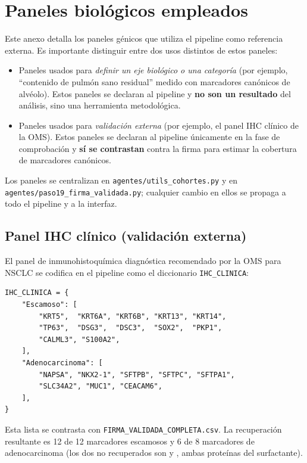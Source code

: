 \chapter{Paneles biológicos empleados}
\label{anexo:paneles}

Este anexo detalla los paneles génicos que utiliza el pipeline como
referencia externa. Es importante distinguir entre dos usos distintos de
estos paneles:

\begin{itemize}
  \item Paneles usados para \emph{definir un eje biológico o una
  categoría} (por ejemplo, ``contenido de pulmón sano residual''
  medido con marcadores canónicos de alvéolo). Estos paneles se declaran
  al pipeline y \textbf{no son un resultado} del análisis, sino una
  herramienta metodológica.
  \item Paneles usados para \emph{validación externa} (por ejemplo, el
  panel IHC clínico de la OMS). Estos paneles se declaran al pipeline
  únicamente en la fase de comprobación y \textbf{sí se contrastan}
  contra la firma para estimar la cobertura de marcadores canónicos.
\end{itemize}

Los paneles se centralizan en \texttt{agentes/utils\_cohortes.py} y en
\texttt{agentes/paso19\_firma\_validada.py}; cualquier cambio en ellos
se propaga a todo el pipeline y a la interfaz.

\section*{Panel IHC clínico (validación externa)}
{}

El panel de inmunohistoquímica diagnóstica recomendado por la OMS para
NSCLC se codifica en el pipeline como el diccionario \texttt{IHC\_CLINICA}:

\begin{lstlisting}[style=python, caption={Panel IHC clínico usado como validación externa.}]
IHC_CLINICA = {
    "Escamoso": [
        "KRT5",  "KRT6A", "KRT6B", "KRT13", "KRT14",
        "TP63",  "DSG3",  "DSC3",  "SOX2",  "PKP1",
        "CALML3", "S100A2",
    ],
    "Adenocarcinoma": [
        "NAPSA", "NKX2-1", "SFTPB", "SFTPC", "SFTPA1",
        "SLC34A2", "MUC1", "CEACAM6",
    ],
}
\end{lstlisting}

Esta lista se contrasta con \texttt{FIRMA\_VALIDADA\_COMPLETA.csv}. La
recuperación resultante es 12 de 12 marcadores escamosos y 6 de 8
marcadores de adenocarcinoma (los dos no recuperados son
 y , ambas proteínas del surfactante).

